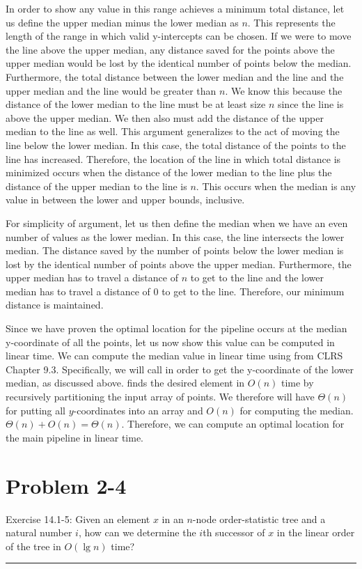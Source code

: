 \documentclass[11pt]{article}
\def\separateline{\medskip\hrule\medskip}
\DeclarePairedDelimiter\floor{\lfloor}{\rfloor}
\begin{document}
In order to show any value in this range achieves a minimum total distance, let us define the upper median minus the lower median as $n$. This represents the length of the range in which valid y-intercepts can be chosen. If we were to move the line above the upper median, any distance saved for the points above the upper median would be lost by the identical number of points below the median. Furthermore, the total distance between the lower median and the line and the upper median and the line would be greater than $n$. We know this because the distance of the lower median to the line must be at least size $n$ since the line is above the upper median. We then also must add the distance of the upper median to the line as well. This argument generalizes to the act of moving the line below the lower median. In this case, the total distance of the points to the line has increased. Therefore, the location of the line in which total distance is minimized occurs when the distance of the lower median to the line plus the distance of the upper median to the line is $n$. This occurs when the median is any value in between the lower and upper bounds, inclusive.

For simplicity of argument, let us then define the median when we have an even number of values as the lower median. In this case, the line intersects the lower median. The distance saved by the number of points below the lower median is lost by the identical number of points above the upper median. Furthermore, the upper median has to travel a distance of $n$ to get to the line and the lower median has to travel a distance of 0 to get to the line. Therefore, our minimum distance is maintained.

Since we have proven the optimal location for the pipeline occurs at the median y-coordinate of all the points, let us now show this value can be computed in linear time. We can compute the median value in linear time using  from CLRS Chapter 9.3. Specifically, we will call  in order to get the y-coordinate of the lower median, as discussed above.  finds the desired element in $O(n)$ time by recursively partitioning the input array of points. We therefore will have $\Theta(n)$ for putting all $y$-coordinates into an array and $O(n)$ for computing the median. $\Theta(n) + O(n) = \Theta(n)$. Therefore, we can compute an optimal location for the main pipeline in linear time.


\newpage

\section{Problem 2-4}
Exercise 14.1-5: Given an element $x$ in an $n$-node order-statistic tree and a natural number $i$, how can we determine the $i$th successor of $x$ in the linear order of the tree in $O(\lg{n})$ time?
\separateline
\end{document}
